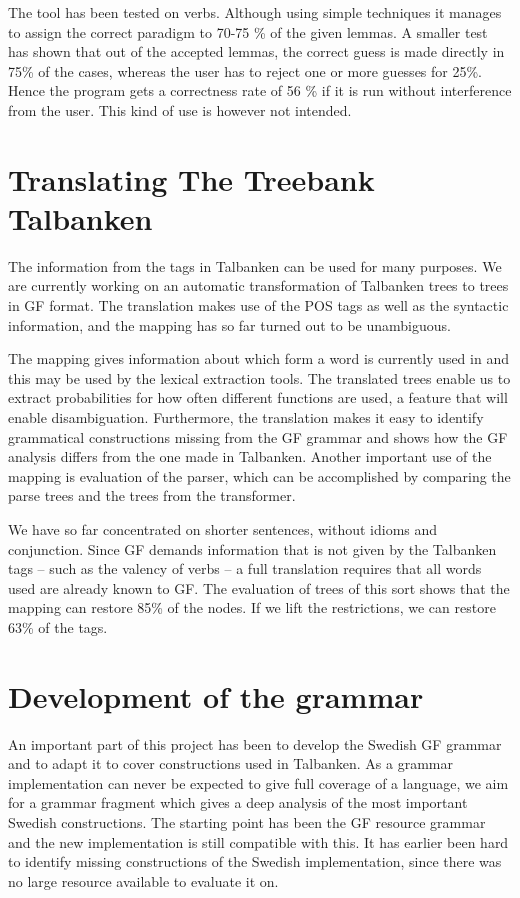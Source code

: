 \documentclass[10pt, a4paper]{article}
\begin{document}
The tool has been tested on verbs. Although using simple techniques it 
manages to assign the correct paradigm to 70-75 \% of the given lemmas.
A smaller test has shown that out of the accepted lemmas, the correct guess is
made directly in 75\% of the cases, whereas the user has to reject one or more
guesses for 25\%. Hence the program gets a correctness rate of 56 \% if it is
run without interference from the user. This kind of use is however not intended.



\section{Translating The Treebank Talbanken}
The information from the tags in Talbanken can be used for many purposes.
We are currently working on an automatic transformation of Talbanken trees 
to trees in GF format. The translation makes use of the POS tags as well as
the syntactic information, and the mapping has so far turned out to be unambiguous. 

The mapping gives information about which form a word is
currently used in and this may be used by the lexical extraction
tools.
The translated trees enable us to extract probabilities for how often
different functions are used, a feature that will enable disambiguation.
Furthermore, the translation makes it easy to identify grammatical constructions
missing from the GF grammar and shows how the GF analysis differs from the one made
in Talbanken.
Another important use of the mapping is evaluation of the parser, which can be
accomplished by comparing the parse trees and the trees from the transformer.

We have so far concentrated on shorter sentences, without idioms and
conjunction. 
Since GF demands information 
that is not given by the Talbanken tags -- such as the valency of verbs -- a
full translation requires that all words used are already known to GF. 
The evaluation of trees of this sort shows that the mapping
can restore 85\% of the nodes. 
If we lift the restrictions, we can restore 63\% of the tags.

\section{Development of the grammar}
An important part of this project has been to develop the Swedish GF grammar and
to adapt it to cover constructions used in Talbanken. As a grammar
implementation can never be expected to give
full coverage of a language, we aim for a grammar fragment which gives a deep
analysis of the most important Swedish constructions.
The starting point has been the GF resource grammar and the new implementation is
still compatible with this.
It has earlier been hard to identify missing constructions of the Swedish
implementation, since there was no large resource available to evaluate it on.
\end{document}
